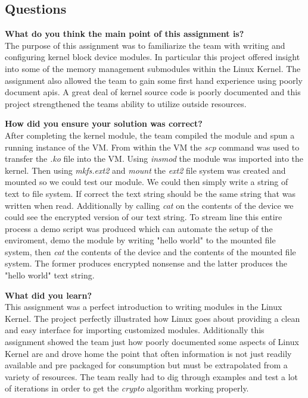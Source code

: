 \documentclass[10pt,onecolumn,draftclsnofoot]{IEEEtran} %
\begin{document}
\begin{singlespace}
\section{\bf Questions}

        \textbf{What do you think the main point of this assignment is?}\\

                \normalfont \indent The purpose of this assignment was to familiarize the team with writing and configuring kernel block device modules. In particular this project offered insight into some of the memory management submodules within the Linux Kernel. The assignment also allowed the team to gain some first hand experience using poorly document apis. A great deal of kernel source code is poorly documented and this project strengthened the teams ability to utilize outside resources. 
        
        \textbf{How did you ensure your solution was correct?}\\

                \normalfont \indent After completing the kernel module, the team compiled the module and spun a running instance of the VM. From within the VM the \textit{scp} command was used to transfer the \textit{.ko} file into the VM. Using \textit{insmod} the module was imported into the kernel. Then using \textit{mkfs.ext2} and \textit{mount} the \textit{ext2} file system was created and mounted so we could test our module. We could then simply write a string of text to file system. If correct the text string should be the same string that was written when read. Additionally by calling \textit{cat } on the contents of the device we could see the encrypted version of our text string. To stream line this entire process a demo script was produced which can automate the setup of the enviroment, demo the module by writing "hello world" to the mounted file system, then \textit{cat} the contents of the device and the contents of the mounted file system. The former produces encrypted nonsense and the latter produces the "hello world" text string. 


        \textbf{What did you learn?}\\
        \normalfont \indent This assignment was a perfect introduction to writing modules in the Linux Kernel. The project perfectly illustrated how Linux goes about providing a clean and easy interface for importing customized modules. Additionally this assignment showed the team just how poorly documented some aspects of Linux Kernel are and drove home the point that often information is not just readily available and pre packaged for consumption but must be extrapolated from a variety of resources. The team really had to dig through examples and test a lot of iterations in order to get the \textit{crypto} algorithm working properly.


\end{singlespace}
\end{document}
